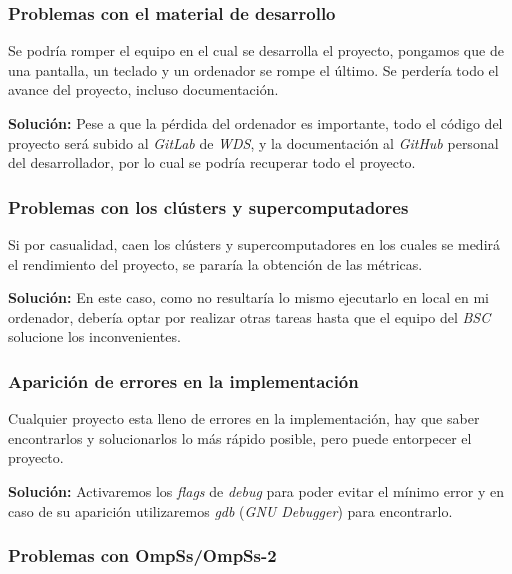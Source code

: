 \documentclass[a4paper]{article}
\begin{document}
\subsubsection{Problemas con el material de desarrollo}

Se podría romper el equipo en el cual se desarrolla el proyecto, pongamos que de una pantalla, un teclado y un ordenador se rompe el último. Se perdería todo el avance del proyecto, incluso documentación.
\par\medskip

\textbf{Solución:} Pese a que la pérdida del ordenador es importante, todo el código del proyecto será subido al \textit{GitLab} de \textit{WDS}, y la documentación al \textit{GitHub} personal del desarrollador, por lo cual se podría recuperar todo el  proyecto.

\subsubsection{Problemas con los clústers y supercomputadores}

Si por casualidad, caen los clústers y supercomputadores en los cuales se medirá el rendimiento del proyecto, se pararía la obtención de las métricas. 
\par\medskip

\textbf{Solución:} En este caso, como no resultaría lo mismo ejecutarlo en local en mi ordenador, debería optar por realizar otras tareas hasta que el equipo del \textit{BSC} solucione los inconvenientes.

\subsubsection{Aparición de errores en la implementación}

Cualquier proyecto esta lleno de errores en la implementación, hay que saber encontrarlos y solucionarlos lo más rápido posible, pero puede entorpecer el proyecto.
\par\medskip

\textbf{Solución:} Activaremos los \textit{flags} de \textit{debug} para poder evitar el mínimo error y en caso de su aparición utilizaremos \textit{gdb} (\textit{GNU Debugger}) para encontrarlo.

\subsubsection{Problemas con OmpSs/OmpSs-2}
\end{document}
